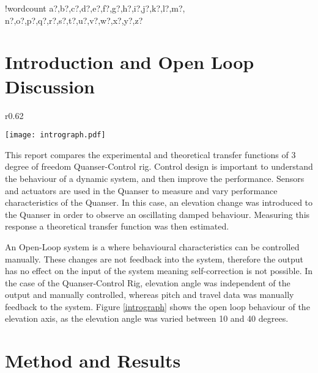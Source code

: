 \documentclass[11pt]{article}
\newcounter{words}
\newenvironment{counted}{%
  \setcounter{words}{0}
  \SearchList!{wordcount}{\stepcounter{words}}
    {a?,b?,c?,d?,e?,f?,g?,h?,i?,j?,k?,l?,m?,
    n?,o?,p?,q?,r?,s?,t?,u?,v?,w?,x?,y?,z?}
  \UndoBoundary{'}
  \SearchOrder{p;}}{%
  \StopSearching}
\begin{document}
\clearpage
{}
\begin{counted} %
\section{Introduction and Open Loop
Discussion}\label{introduction-and-open-loop-discussion}

\begin{wrapfigure}{r}{0.62\textwidth}
  \begin{center}
  \vspace{-20pt}
  \texttt{[image: intrograph.pdf]}
  \end{center}
  \caption{Graph Showing the Open Loop Nature of the Experimental Quanser Response}
  \label{intrograph}
  \vspace{-15pt}
\end{wrapfigure}

This report compares the experimental and theoretical transfer functions
of 3 degree of freedom Quanser-Control rig. Control design is important
to understand the behaviour of a dynamic system, and then improve the
performance. Sensors and actuators are used in the Quanser to measure
and vary performance characteristics of the Quanser. In this case, an
elevation change was introduced to the Quanser in order to observe an
oscillating damped behaviour. Measuring this response a theoretical
transfer function was then estimated.

An Open-Loop system is a where behavioural characteristics can be
controlled manually. These changes are not feedback into the system,
therefore the output has no effect on the input of the system
\cite{openloop} meaning self-correction is not possible. In the case of
the Quanser-Control Rig, elevation angle was independent of the output
and manually controlled, whereas pitch and travel data was manually
feedback to the system. Figure \ref{intrograph} shows the open loop
behaviour of the elevation axis, as the elevation angle was varied
between 10 and 40 degrees.

\section{Method and Results}\label{method-and-results}


\end{counted}
\end{document}
